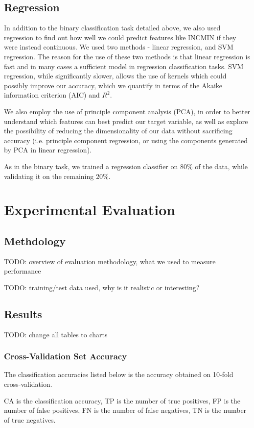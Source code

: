 \documentclass[11pt,letter]{article}
\begin{document}
\subsection{Regression}
In addition to the binary classification task detailed above, we also used regression to find out how well we could predict features like INCMIN if they were instead continuous. We used two methods - linear regression, and SVM regression. The reason for the use of these two methods is that linear regression is fast and in many cases a sufficient model in regression classification tasks. SVM regression, while significantly slower, allows the use of kernels which could possibly improve our accuracy, which we quantify in terms of the Akaike information criterion (AIC) and $R^2$.

We also employ the use of principle component analysis (PCA), in order to better understand which features can best predict our target variable, as well as explore the possibility of reducing the dimensionality of our data without sacrificing accuracy (i.e. principle component regression, or using the components generated by PCA in linear regression).

As in the binary task, we trained a regression classifier on 80\% of the data, while validating it on the remaining 20\%.

\section{Experimental Evaluation}
\subsection{Methdology}
TODO: overview of evaluation methodology, what we used to measure performance

TODO: training/test data used, why is it realistic or interesting?

\subsection{Results}
TODO: change all tables to charts
\subsubsection{Cross-Validation Set Accuracy}
The classification accuracies listed below is the accuracy obtained on 10-fold cross-validation.

CA is the classification accuracy, TP is the number of true positives, FP is the number of false positives, FN is the number of false negatives, TN is the number of true negatives.
\end{document}

